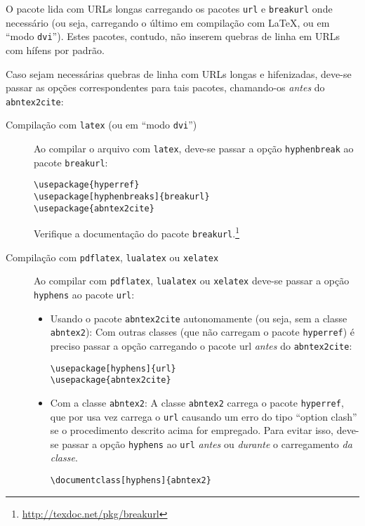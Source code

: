 \documentclass[a4paper]{ltxdoc}
\begin{document}
O pacote lida com URLs longas carregando os pacotes \texttt{url} e
\texttt{breakurl} onde necessário (ou seja, carregando o último em
compilação com \LaTeX, ou em ``modo \texttt{dvi}''). Estes pacotes,
contudo, não inserem quebras de linha em URLs com hífens por padrão. 

Caso sejam necessárias quebras de linha com URLs longas e hifenizadas,
deve-se passar as opções correspondentes para tais pacotes, chamando-os
\emph{antes} do \texttt{abntex2cite}:

\begin{description}

  \item[Compilação com \texttt{latex} (ou em ``modo \texttt{dvi}'')]
    Ao compilar o arquivo com \texttt{latex}, deve-se passar a opção
    \texttt{hyphenbreak} ao pacote \texttt{breakurl}:

    \begin{verbatim}
\usepackage{hyperref}
\usepackage[hyphenbreaks]{breakurl}
\usepackage{abntex2cite}
    \end{verbatim}

    Verifique a documentação do pacote
    \texttt{breakurl}.\footnote{\url{http://texdoc.net/pkg/breakurl}}

  \item[Compilação com \texttt{pdflatex}, \texttt{lualatex} ou
    \texttt{xelatex}] Ao compilar com \texttt{pdflatex},
    \texttt{lualatex} ou \texttt{xelatex} deve-se passar a opção
    \texttt{hyphens} ao pacote \texttt{url}:

    \begin{itemize}
      \item Usando o pacote \texttt{abntex2cite} autonomamente (ou
        seja, sem a classe \texttt{abntex2}): Com outras classes (que
        não carregam o pacote \texttt{hyperref}) é preciso passar a
        opção carregando o pacote url \emph{antes} do
        \texttt{abntex2cite}:

        \begin{verbatim}
\usepackage[hyphens]{url}
\usepackage{abntex2cite}
        \end{verbatim}

    \item Com a classe \texttt{abntex2}: A classe \texttt{abntex2}
      carrega o pacote \texttt{hyperref}, que por usa vez carrega o
      \texttt{url} causando um erro do tipo ``option clash'' se o
      procedimento descrito acima for empregado. Para evitar isso,
      deve-se passar a opção \texttt{hyphens} ao \texttt{url}
      \emph{antes} ou \emph{durante} o carregamento \emph{da classe}.

        \begin{verbatim}
\documentclass[hyphens]{abntex2}
        \end{verbatim}

    \end{itemize}
\end{description}
\end{document}
